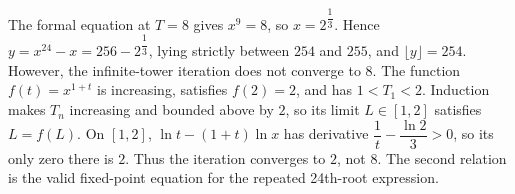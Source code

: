 The formal equation at $T=8$ gives $x^9=8$, so $x=2^{\dfrac{1}{3}}$. Hence $y=x^{24}-x=256-2^{\dfrac{1}{3}}$, lying strictly between $254$ and $255$, and $\boxed{\lfloor y\rfloor=254}$. However, the infinite-tower iteration does not converge to $8$. The function $f(t)=x^{1+t}$ is increasing, satisfies $f(2)=2$, and has $1<T_1<2$. Induction makes $T_n$ increasing and bounded above by $2$, so its limit $L\in[1,2]$ satisfies $L=f(L)$. On $[1,2]$, $\ln t-(1+t)\ln x$ has derivative $\dfrac{1}{t}-\dfrac{\ln2}{3}>0$, so its only zero there is $2$. Thus the iteration converges to $\boxed2$, not $8$. The second relation is the valid fixed-point equation for the repeated 24th-root expression.
